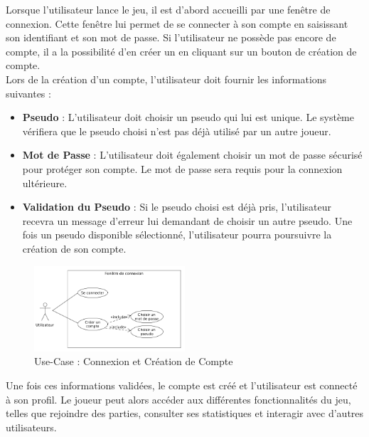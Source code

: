 \documentclass{report}
\begin{document}
\noindent Lorsque l’utilisateur lance le jeu, il est d'abord accueilli par une fenêtre de connexion. Cette fenêtre lui permet de se connecter à son compte en saisissant son identifiant et son mot de passe. Si l'utilisateur ne possède pas encore de compte, il a la possibilité d'en créer un en cliquant sur un bouton de création de compte. \\

\noindent Lors de la création d'un compte, l'utilisateur doit fournir les informations suivantes :
\begin{itemize}
    \item \textbf{Pseudo} : L'utilisateur doit choisir un pseudo qui lui est unique. Le système vérifiera que le pseudo choisi n'est pas déjà utilisé par un autre joueur.
    \item \textbf{Mot de Passe} : L'utilisateur doit également choisir un mot de passe sécurisé pour protéger son compte. Le mot de passe sera requis pour la connexion ultérieure.
    \item \textbf{Validation du Pseudo} : Si le pseudo choisi est déjà pris, l'utilisateur recevra un message d'erreur lui demandant de choisir un autre pseudo. Une fois un pseudo disponible sélectionné, l'utilisateur pourra poursuivre la création de son compte. \\
\end{itemize}

\vspace{-2em}

\begin{figure}[H]
    \centering
     \includegraphics[width=0.5\textwidth, keepaspectratio]{src/user_req/connexion.png}
    \caption{Use-Case : Connexion et Création de Compte}
    \label{fig:use_case_connexion}
\end{figure}

\noindent Une fois ces informations validées, le compte est créé et l'utilisateur est connecté à son profil. Le joueur peut alors accéder aux différentes fonctionnalités du jeu, telles que rejoindre des parties, consulter ses statistiques et interagir avec d'autres utilisateurs.
\end{document}
